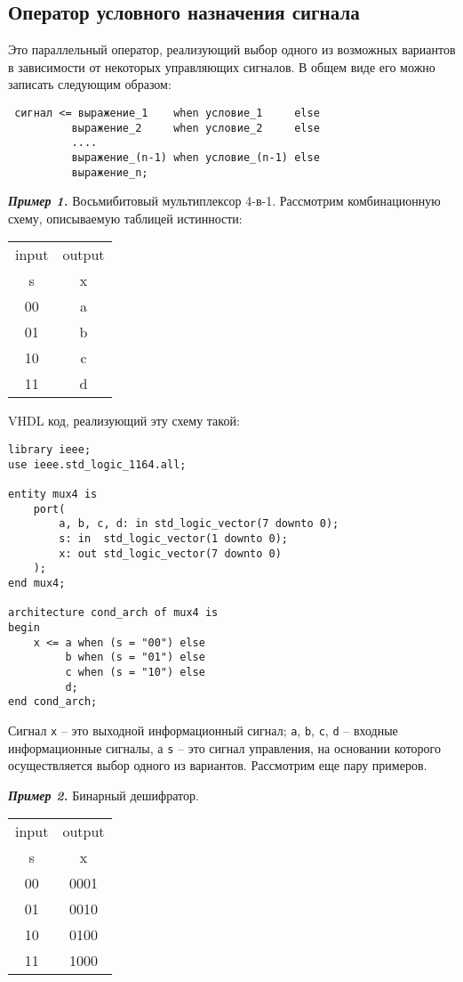 \subsection{Оператор условного назначения сигнала}
Это параллельный оператор, реализующий выбор одного из возможных вариантов в зависимости от некоторых управляющих сигналов. В общем виде его можно записать следующим образом:

\begin{lstlisting}
 сигнал <= выражение_1    when условие_1     else 
          выражение_2     when условие_2     else 
          ....
          выражение_(n-1) when условие_(n-1) else 
          выражение_n;
\end{lstlisting}

\textbf{\textit{Пример 1.}} Восьмибитовый мультиплексор 4-в-1.
Рассмотрим комбинационную схему, описываемую таблицей истинности:
\begin{table}[h]
\centering
\begin{tabular}{|c|c|}
\hline
input &     output \\
s     &     x      \\ \hline
00    &     a      \\
01    &     b      \\
10    &     c      \\
11    &     d      \\
\hline
\end{tabular}
\end{table}

VHDL код, реализующий эту схему такой:
\begin{lstlisting}
library ieee;
use ieee.std_logic_1164.all;

entity mux4 is
    port(
        a, b, c, d: in std_logic_vector(7 downto 0);
        s: in  std_logic_vector(1 downto 0);
        x: out std_logic_vector(7 downto 0)
    );
end mux4;

architecture cond_arch of mux4 is
begin
    x <= a when (s = "00") else
         b when (s = "01") else
         c when (s = "10") else
         d;
end cond_arch;
\end{lstlisting}

Сигнал \lstinline?x? – это выходной информационный сигнал; \lstinline?a?, \lstinline?b?, \lstinline?c?, \lstinline?d? – входные информационные сигналы, а \lstinline?s? – это сигнал управления, на основании которого осуществляется выбор одного из вариантов. 
Рассмотрим еще пару примеров.

\textbf{\textit{Пример 2.}} Бинарный дешифратор.
\begin{table}[h]
\centering
\begin{tabular}{|c|c|}
\hline
input &     output \\
s     &     x      \\ \hline
00    &     0001   \\
01    &     0010   \\
10    &     0100   \\
11    &     1000   \\
\hline
\end{tabular}
\end{table}

